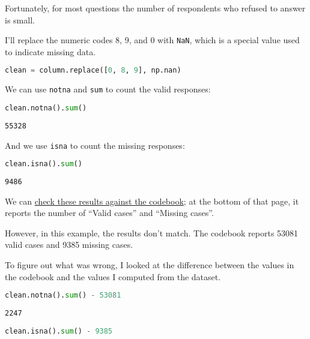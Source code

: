 Fortunately, for most questions the number of respondents who refused to
answer is small.

I'll replace the numeric codes 8, 9, and 0 with
\passthrough{\lstinline!NaN!}, which is a special value used to indicate
missing data.

\begin{lstlisting}[language=Python]
clean = column.replace([0, 8, 9], np.nan)
\end{lstlisting}

We can use \passthrough{\lstinline!notna!} and
\passthrough{\lstinline!sum!} to count the valid responses:

\begin{lstlisting}[language=Python]
clean.notna().sum()
\end{lstlisting}

\begin{lstlisting}[]
55328
\end{lstlisting}

And we use \passthrough{\lstinline!isna!} to count the missing
responses:

\begin{lstlisting}[language=Python]
clean.isna().sum()
\end{lstlisting}

\begin{lstlisting}[]
9486
\end{lstlisting}

We can
\href{https://gssdataexplorer.norc.org/projects/52787/variables/178/vshow}{check
these results against the codebook}; at the bottom of that page, it
reports the number of ``Valid cases'' and ``Missing cases''.

However, in this example, the results don't match. The codebook reports
53081 valid cases and 9385 missing cases.

To figure out what was wrong, I looked at the difference between the
values in the codebook and the values I computed from the dataset.

\begin{lstlisting}[language=Python]
clean.notna().sum() - 53081
\end{lstlisting}

\begin{lstlisting}[]
2247
\end{lstlisting}

\begin{lstlisting}[language=Python]
clean.isna().sum() - 9385
\end{lstlisting}

